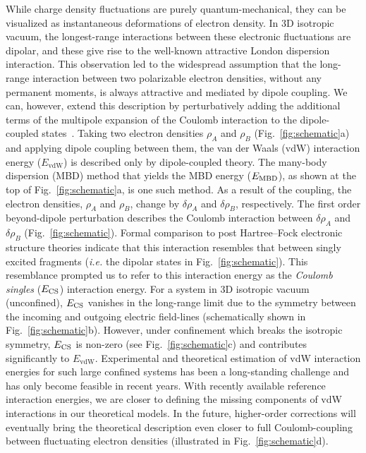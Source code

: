 \documentclass[aps,prl,groupaddress, twocolumn]{revtex4-1}  %
\begin{document}
While charge density fluctuations are purely quantum-mechanical, they can be visualized as instantaneous deformations of electron density. In 3D isotropic vacuum, the longest-range interactions between these electronic fluctuations are dipolar, and these give rise to the well-known attractive London dispersion interaction. This observation led to the widespread assumption that the long-range interaction between two polarizable electron densities, without any permanent moments, is always attractive and mediated by dipole coupling. We can, however, extend this description by perturbatively adding the additional terms of the multipole expansion of the Coulomb interaction to the dipole-coupled states~\cite{sadhukhan_prl_2017}. Taking two electron densities $\rho_A$ and $\rho_B$ (Fig.~\ref{fig:schematic}a) and applying dipole coupling between them, the van der Waals (vdW) interaction energy ($E_\text{vdW}$) is described only by dipole-coupled theory. The many-body dispersion (MBD) method that yields the MBD energy ($E_{\rm MBD}$), as shown at the top of Fig.~\ref{fig:schematic}a, is one such method. As a result of the coupling, the electron densities, $\rho_A$ and $\rho_B$, change by $\delta \rho_A$ and $\delta \rho_B$, respectively. The first order beyond-dipole perturbation describes the Coulomb interaction between $\delta \rho_A$ and $\delta \rho_B$ (Fig.~\ref{fig:schematic}). Formal comparison to post Hartree--Fock electronic structure theories indicate that this interaction resembles that between singly excited fragments (\textit{i.e.} the dipolar states in Fig.~\ref{fig:schematic}). This resemblance prompted us to refer to this interaction energy as the \textit{Coulomb singles} ($E_{\rm CS}$) interaction energy. For a system in 3D isotropic vacuum (unconfined), $E_{\rm CS}$ vanishes in the long-range limit due to the symmetry between the incoming and outgoing electric field-lines (schematically shown in Fig.~\ref{fig:schematic}b). However, under confinement which breaks the isotropic symmetry, $E_{\rm CS}$ is non-zero (see Fig.~\ref{fig:schematic}c) and contributes significantly to $E_\text{vdW}$. Experimental and theoretical estimation of vdW interaction energies for such large confined systems has been a long-standing challenge and has only become feasible in recent years. With recently available reference interaction energies, we are closer to defining the missing components of vdW interactions in our theoretical models. In the future, higher-order corrections will eventually bring the theoretical description even closer to full Coulomb-coupling between fluctuating electron densities (illustrated in Fig.~\ref{fig:schematic}d).
\end{document}
